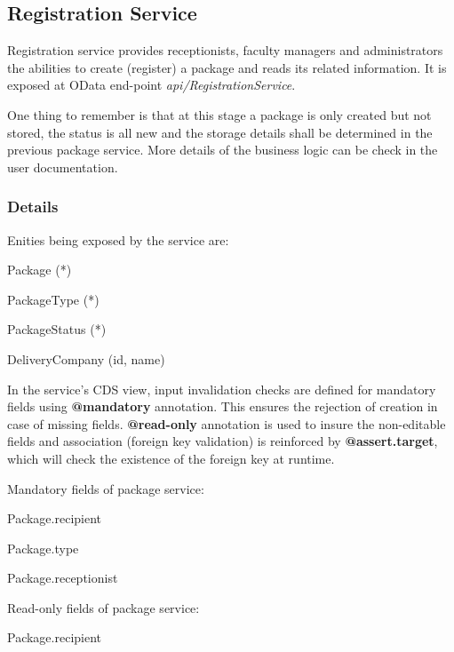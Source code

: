 \subsection{Registration Service}

Registration service provides receptionists, faculty managers and administrators the abilities to create (register) a package and reads its related information. It is exposed at OData end-point \textit{api/RegistrationService}. 

\bigskip
One thing to remember is that at this stage a package is only created but not stored, the status is all new and the storage details shall be determined in the previous package service. More details of the business logic can be check in the user documentation.

\subsubsection{Details}

Enities being exposed by the service are:
\begin{compactenum}
	\item Package (*)
    \item PackageType (*)
    \item PackageStatus (*)
    \item DeliveryCompany (id, name)
\end{compactenum}

\bigskip
In the service's CDS view, input invalidation checks are defined for mandatory fields using \textbf{@mandatory} annotation. This ensures the rejection of creation in case of missing fields. \textbf{@read-only} annotation is used to insure the non-editable fields and association (foreign key validation) is reinforced by \textbf{@assert.target}, which will check the existence of the foreign key at runtime.

\bigskip
Mandatory fields of package service:
\begin{compactenum}
	\item Package.recipient
    \item Package.type
    \item Package.receptionist
\end{compactenum}

\bigskip
Read-only fields of package service:
\begin{compactenum}
	\item Package.recipient
\end{compactenum}

